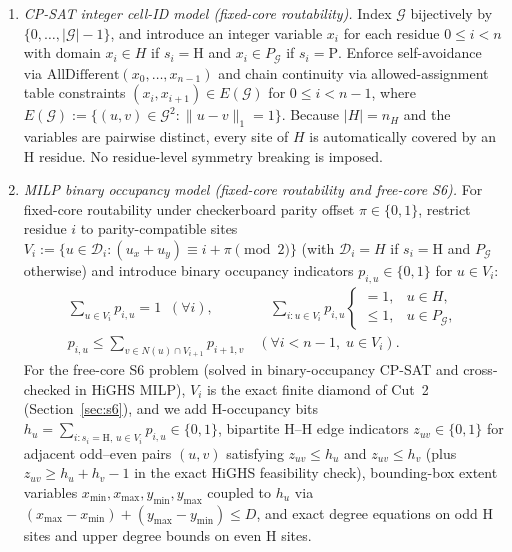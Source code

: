 \documentclass[11pt]{article}
\begin{document}
\begin{enumerate}[leftmargin=*,topsep=2pt,itemsep=2pt]
\item \emph{CP-SAT integer cell-ID model (fixed-core routability).} Index $\mathcal{G}$ bijectively by $\{0, \dots, |\mathcal{G}| - 1\}$, and introduce an integer variable $x_i$ for each residue $0 \le i < n$ with domain $x_i \in H$ if $s_i = \mathrm{H}$ and $x_i \in P_{\mathcal{G}}$ if $s_i = \mathrm{P}$. Enforce self-avoidance via $\mathrm{AllDifferent}(x_0, \dots, x_{n-1})$ and chain continuity via allowed-assignment table constraints $(x_i, x_{i+1}) \in E(\mathcal{G})$ for $0 \le i < n - 1$, where $E(\mathcal{G}) := \{(u, v) \in \mathcal{G}^2 : \|u - v\|_1 = 1\}$. Because $|H| = n_H$ and the variables are pairwise distinct, every site of $H$ is automatically covered by an H residue. No residue-level symmetry breaking is imposed.

\item \emph{MILP binary occupancy model (fixed-core routability and free-core S6).} For fixed-core routability under checkerboard parity offset $\pi \in \{0, 1\}$, restrict residue $i$ to parity-compatible sites $V_i := \{u \in \mathcal{D}_i : (u_x + u_y) \equiv i + \pi \pmod 2\}$ (with $\mathcal{D}_i = H$ if $s_i = \mathrm{H}$ and $P_{\mathcal{G}}$ otherwise) and introduce binary occupancy indicators $p_{i,u} \in \{0, 1\}$ for $u \in V_i$:
\begin{equation}\label{eq:milp_core}
\begin{gathered}
  \sum_{u \in V_i} p_{i,u} = 1 \;\; (\forall i),
  \qquad\qquad
  \sum_{i : u \in V_i} p_{i,u} \begin{cases} = 1, & u \in H, \\ \le 1, & u \in P_{\mathcal{G}}, \end{cases} \\[3pt]
  p_{i,u} \le \sum_{v \in N(u) \cap V_{i+1}} p_{i+1,v} \quad (\forall i < n - 1,\; u \in V_i).
\end{gathered}
\end{equation}
For the free-core S6 problem (solved in binary-occupancy CP-SAT and cross-checked in HiGHS MILP), $V_i$ is the exact finite diamond of Cut~2 (Section~\ref{sec:s6}), and we add H-occupancy bits $h_u = \sum_{i : s_i=\mathrm{H},\, u \in V_i} p_{i,u} \in \{0, 1\}$, bipartite H--H edge indicators $z_{uv} \in \{0, 1\}$ for adjacent odd--even pairs $(u, v)$ satisfying $z_{uv} \le h_u$ and $z_{uv} \le h_v$ (plus $z_{uv} \ge h_u + h_v - 1$ in the exact HiGHS feasibility check), bounding-box extent variables $x_{\min}, x_{\max}, y_{\min}, y_{\max}$ coupled to $h_u$ via $(x_{\max} - x_{\min}) + (y_{\max} - y_{\min}) \le D$, and exact degree equations on odd H sites and upper degree bounds on even H sites.


\end{enumerate}
\end{document}
